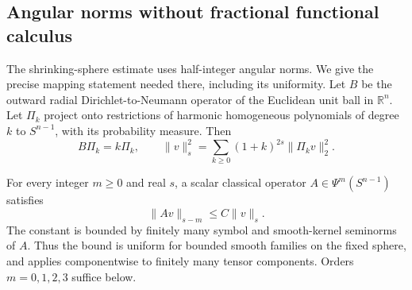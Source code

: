 \subsection{Angular norms without fractional functional calculus}
\label{prelim:spectral}
The shrinking-sphere estimate uses half-integer angular norms. We give
the precise mapping statement needed there, including its uniformity.
Let $B$ be the outward radial Dirichlet-to-Neumann operator of the
Euclidean unit ball in $\mathbb R^n$. Let $\Pi_k$ project onto restrictions
of harmonic homogeneous polynomials of degree $k$ to $S^{n-1}$, with
its probability measure. Then
\[
 B\Pi_k=k\Pi_k,\qquad
 \|v\|_s^2=\sum_{k\ge0}(1+k)^{2s}\|\Pi_kv\|_2^2.
\]

\begin{lemma}\label{prelim:spectral-map}
For every integer $m\ge0$ and real $s$, a scalar classical operator
$A\in\Psi^m(S^{n-1})$ satisfies
\begin{equation}\label{prelim:spectral-bound}
 \|Av\|_{s-m}\le C\|v\|_s.
\end{equation}
The constant is bounded by finitely many symbol and smooth-kernel
seminorms of $A$. Thus the bound is uniform for bounded smooth families
on the fixed sphere, and applies componentwise to finitely many tensor
components. Orders $m=0,1,2,3$ suffice below.
\end{lemma}

